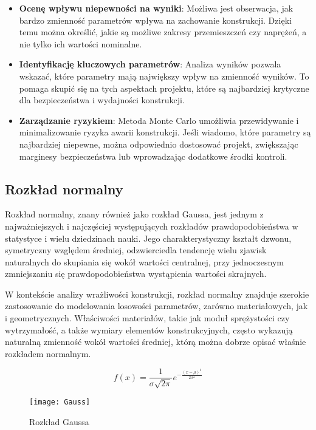\begin{itemize}
    \item \textbf{Ocenę wpływu niepewności na wyniki}: Możliwa jest obserwacja, jak bardzo zmienność parametrów wpływa na zachowanie konstrukcji. Dzięki temu można określić, jakie są możliwe zakresy przemieszczeń czy naprężeń, a nie tylko ich wartości nominalne.
    \item \textbf{Identyfikację kluczowych parametrów}: Analiza wyników pozwala wskazać, które parametry mają największy wpływ na zmienność wyników. To pomaga skupić się na tych aspektach projektu, które są najbardziej krytyczne dla bezpieczeństwa i wydajności konstrukcji.
    \item \textbf{Zarządzanie ryzykiem}: Metoda Monte Carlo umożliwia przewidywanie i minimalizowanie ryzyka awarii konstrukcji. Jeśli wiadomo, które parametry są najbardziej niepewne, można odpowiednio dostosować projekt, zwiększając marginesy bezpieczeństwa lub wprowadzając dodatkowe środki kontroli.
\end{itemize}

\subsection{Rozkład normalny}

Rozkład normalny, znany również jako rozkład Gaussa, jest jednym z najważniejszych i najczęściej występujących rozkładów prawdopodobieństwa w statystyce i wielu dziedzinach nauki.
Jego charakterystyczny kształt dzwonu, symetryczny względem średniej, odzwierciedla tendencję wielu zjawisk naturalnych do skupiania się wokół wartości centralnej, przy jednoczesnym zmniejszaniu się prawdopodobieństwa wystąpienia wartości skrajnych.

W kontekście analizy wrażliwości konstrukcji, rozkład normalny znajduje szerokie zastosowanie do modelowania losowości parametrów, zarówno materiałowych, jak i geometrycznych.
Właściwości materiałów, takie jak moduł sprężystości czy wytrzymałość, a także wymiary elementów konstrukcyjnych, często wykazują naturalną zmienność wokół wartości średniej, którą można dobrze opisać właśnie rozkładem normalnym.

\begin{equation}
    f(x) = \frac{1}{\sigma \sqrt{2\pi}} e^{-\frac{(x - \mu)^2}{2\sigma^2}}\label{eq:gauss}
\end{equation}

\begin{figure}[H]
    \centering
    \texttt{[image: Gauss]}
    \caption{Rozkład Gaussa}
\end{figure}

